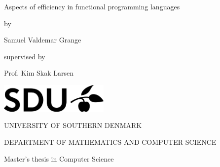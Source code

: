 \documentclass[11pt,oneside,a4paper]{report}
\theoremstyle{plain}
\theoremstyle{case}
\theoremstyle{definition}
\begin{document}
\begin{titlepage}
	\begin{center}
		\vspace*{1cm}
		\huge{Aspects of efficiency in functional programming languages}

		\vspace*{0.5cm}
		\large{by}

		\vspace{0.5cm}
		\Large{Samuel Valdemar Grange}

		\vspace*{0.5cm}
		\normalsize{supervised by}

		\vspace{0.5cm}
		\large{Prof. Kim Skak Larsen}

		\vfill

		\vspace*{0.7cm}
		\includegraphics[width=0.4\textwidth]{sdulogo}

		\vspace*{1cm}
		\MakeUppercase{University of southern Denmark}

		\vspace*{0.3cm}
		\MakeUppercase{Department of mathematics and computer science}

		\vspace*{0.3cm}
		\large{Master's thesis in Computer Science}
	\end{center}

\end{titlepage}

\tableofcontents

\clearpage













%
\printbibliography


\end{document}
